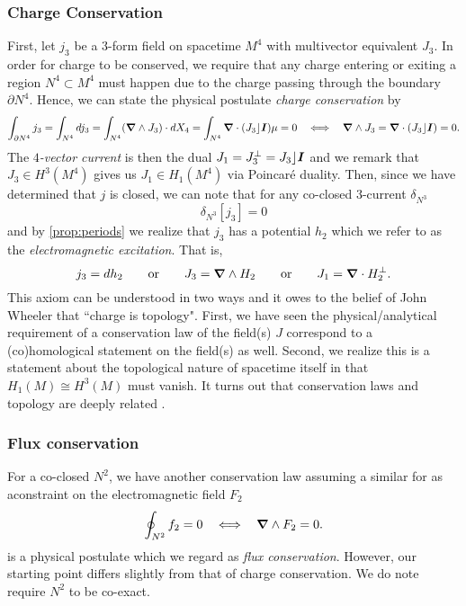 \documentclass[conf]{new-aiaa}
\begin{document}
\subsubsection{Charge Conservation}
First, let $j_3$ be a 3-form field on spacetime $M^4$ with multivector equivalent $J_3$. In order for charge to be conserved, we require that any charge entering or exiting a region $N^4 \subset M^4$ must happen due to the charge passing through the boundary $\partial N^4$. Hence, we can state the physical postulate \emph{charge conservation} by
\begin{equation}
    \label{eq:topological_charge_conservation}
    \int_{\partial N^4} j_3 = \int_{N^4} dj_3= \int_{N^4} (\boldsymbol{\nabla} \wedge J_3) \cdot dX_4 = \int_{N^4} \boldsymbol{\nabla} \cdot (J_3 \rfloor \boldsymbol{I}) \mu = 0    ~~\iff~~ \boldsymbol{\nabla} \wedge J_3=\boldsymbol{\nabla} \cdot (J_3 \rfloor \boldsymbol{I}) = 0.
\end{equation}
The \emph{$4$-vector current} is then the dual $J_1 = J_3^\perp=J_3 \rfloor \boldsymbol{I}$ and we remark that $J_3 \in H^3(M^4)$ gives us $J_1 \in H_1(M^4)$ via Poincar\'e duality. Then, since we have determined that $j$ is closed, we can note that for any co-closed $3$-current $\delta_{N^3}$
\begin{equation}
    \delta_{N^3}[j_3] = 0
\end{equation}
and by \cref{prop:periods} we realize that $j_3$ has a potential $h_2$ which we refer to as the \emph{electromagnetic excitation}. That is, 
\begin{equation}
\label{eq:current_from_excitation}
    j_3=dh_2 \qquad \textrm{or} \qquad J_3 = \boldsymbol{\nabla} \wedge H_2 \qquad \textrm{or} \qquad J_1 = \boldsymbol{\nabla} \cdot H_2^\perp.
\end{equation}
This axiom can be understood in two ways and it owes to the belief of John Wheeler that ``charge is topology". First, we have seen the physical/analytical requirement of a conservation law of the field(s) $J$ correspond to a (co)homological statement on the field(s) as well.  Second, we realize this is a statement about the topological nature of spacetime itself in that $H_1(M)\cong H^3(M)$ must vanish. It turns out that conservation laws and topology are deeply related \cite{westenholz_topological_nodate}.

\subsubsection{Flux conservation}

For a co-closed $N^2$, we have another conservation law assuming a similar for as aconstraint on the electromagnetic field $F_2$
\begin{equation}
    \label{eq:magnetic_flux_conservation}
    \oint_{N^2} f_2 = 0  ~~\iff~~ \boldsymbol{\nabla} \wedge F_2=0.
\end{equation}
is a physical postulate which we regard as \emph{flux conservation}. However, our starting point differs slightly from that of charge conservation. We do note require $N^2$ to be co-exact. 
\end{document}
